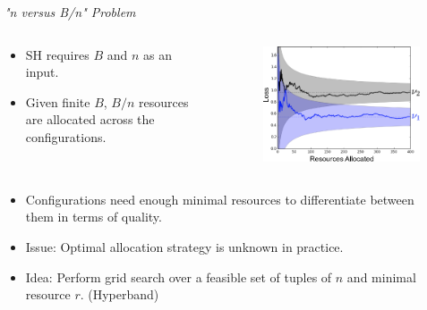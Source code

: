 
\begin{frame}{\emph{"n versus B/n" Problem}}
\begin{columns}

\begin{column}{.45\linewidth}
\begin{itemize}
    \item SH requires $B$ and $n$ as an input.
    \pause
    \item Given finite $B$, $B/n$ resources are allocated across the configurations.
    \pause
\end{itemize}
\end{column}

\begin{column}{.45\linewidth}

\begin{figure}
    \centering
    \vspace{2em}
    \includegraphics[width=0.9\linewidth]{images/intro/differetiatingConfigurations.png}
    \pause
\end{figure}
\end{column}
\end{columns}
\vspace{-10em}
\begin{columns}

\begin{column}{.45\linewidth}
\begin{itemize}
    \item Configurations need enough minimal resources to differentiate between them in terms of quality.
    \pause
    \item Issue: Optimal allocation strategy is unknown in practice.
    \pause
    \item Idea: Perform grid search over a feasible set of tuples of $n$ and minimal resource $r$. (Hyperband) 
\end{itemize}
\end{column}

\begin{column}{.45\linewidth}

\end{column}
    
\end{columns}
    
\end{frame}

